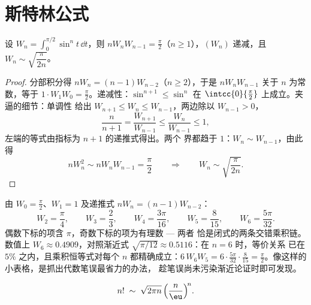 \section{斯特林公式}

\begin{lemma}[沃利斯积分，再探]\label{lem:b2:comparison:wallis}
设 $W_n = \int_0^{\pi/2} \sin^n t\,\dd t$，则 $nW_nW_{n-1} =
\frac\pi2$（$n \geq 1$），$(W_n)$ 递减，且 $W_n \sim
\sqrt{\dfrac{\pi}{2n}}$。
\end{lemma}

\begin{proof}
分部积分得 $nW_n = (n-1)W_{n-2}$（$n \geq 2$），于是
$nW_nW_{n-1}$ 关于 $n$ 为常数，等于 $1 \cdot W_1 W_0 =
\frac\pi2$。递减性：$\sin^{n+1} \leq \sin^n$ 在
$\intcc{0}{\frac\pi2}$ 上成立。夹逼的细节：单调性
给出 $W_{n+1} \leq W_n \leq W_{n-1}$，两边除以 $W_{n-1}
> 0$，
\[
\frac{n}{n+1} = \frac{W_{n+1}}{W_{n-1}} \leq
\frac{W_n}{W_{n-1}} \leq 1 ,
\]
左端的等式由指标为 $n + 1$ 的递推式得出。两个
界都趋于 $1$：$W_n \sim W_{n-1}$，由此得
\[
nW_n^2 \sim nW_nW_{n-1} = \frac\pi2
\qquad\Longrightarrow\qquad
W_n \sim \sqrt{\frac{\pi}{2n}} .
\]
\end{proof}

\begin{example}[最初几个沃利斯积分]\label{ex:b2:comparison:wallisvalues}
由 $W_0 = \frac\pi2$、$W_1 = 1$ 及递推式 $nW_n =
(n-1)W_{n-2}$：
\[
W_2 = \frac\pi4, \qquad
W_3 = \frac23, \qquad
W_4 = \frac{3\pi}{16}, \qquad
W_5 = \frac{8}{15}, \qquad
W_6 = \frac{5\pi}{32}.
\]
偶数下标的项含 $\pi$，奇数下标的项为有理数 --- 两者
恰是闭式的两条交错乘积链。数值上 $W_6
\approx 0.4909$，对照渐近式
$\sqrt{\pi/12} \approx 0.5116$：在 $n = 6$ 时，等价关系
已在 $5\%$ 之内，且乘积恒等式对每个
$n$ 都精确成立：$6\,W_6W_5 = 6\cdot\frac{5\pi}{32}\cdot\frac8{15} =
\frac\pi2$。像这样的小表格，是抓出代数笔误最省力的办法，
趁笔误尚未污染渐近论证时即可发现。
\end{example}

\begin{theorem}[斯特林]\label{thm:b2:comparison:stirling}
\[
n! \;\sim\; \sqrt{2\pi n}\, \Bigl(\frac{n}{\eu}\Bigr)^{\!n}
.\index{Stirling's formula}
\]
\end{theorem}

